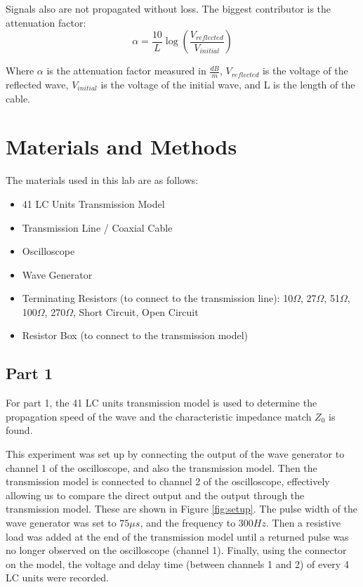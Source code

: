 \documentclass[12pt]{article}
\begin{document}
Signals also are not propagated without loss. The biggest contributor is the attenuation factor:
\begin{equation}
    \alpha = \frac{10}{L} \log{\left(\frac{V_{reflected}}{V_{initial}}\right)}
    \label{eq:attenuation}
\end{equation}

Where $\alpha$ is the attenuation factor measured in $\frac{dB}{m}$, $V_{reflected}$ is the voltage of the reflected wave, $V_{initial}$ is the voltage of the initial wave, and L is the length of the cable.

\section{Materials and Methods}
The materials used in this lab are as follows:
\begin{itemize}
    \item 41 LC Units Transmission Model
    \item Transmission Line / Coaxial Cable
    \item Oscilloscope
    \item Wave Generator
    \item Terminating Resistors (to connect to the transmission line): 10$\Omega$, 27$\Omega$, 51$\Omega$, 100$\Omega$, 270$\Omega$, Short Circuit, Open Circuit
    \item Resistor Box (to connect to the transmission model)
\end{itemize}

\subsection{Part 1}
For part 1, the 41 LC units transmission model is used to determine the propagation speed of the wave and the characteristic impedance match $Z_0$ is found.

This experiment was set up by connecting the output of the wave generator to channel 1 of the oscilloscope, and also the transmission model. 
Then the transmission model is connected to channel 2 of the oscilloscope, effectively allowing us to compare the direct output and the output through the transmission model. These are shown in Figure \ref{fig:setup}.
The pulse width of the wave generator was set to $75\mu s$, and the frequency to $300Hz$. Then a resistive load was added at the end of the transmission model until a returned pulse was no longer observed on the oscilloscope (channel 1). Finally, using the connector on the model, the voltage and delay time (between channels 1 and 2) of every 4 LC units were recorded. 
\end{document}
